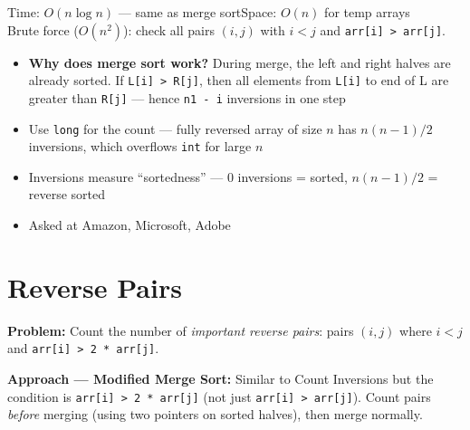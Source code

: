 \documentclass[12pt,a4paper,oneside]{book}
\begin{document}
\begin{complexity}
Time: $O(n \log n)$ --- same as merge sort\quad Space: $O(n)$ for temp arrays\\[4pt]
Brute force ($O(n^2)$): check all pairs $(i,j)$ with $i < j$ and \texttt{arr[i] > arr[j]}.
\end{complexity}

\begin{interviewcorner}
\begin{itemize}
  \item \textbf{Why does merge sort work?} During merge, the left and right halves are already sorted. If \texttt{L[i] > R[j]}, then all elements from \texttt{L[i]} to end of L are greater than \texttt{R[j]} --- hence \texttt{n1 - i} inversions in one step
  \item Use \texttt{long} for the count --- fully reversed array of size $n$ has $n(n-1)/2$ inversions, which overflows \texttt{int} for large $n$
  \item Inversions measure ``sortedness'' --- 0 inversions = sorted, $n(n-1)/2$ = reverse sorted
  \item Asked at Amazon, Microsoft, Adobe
\end{itemize}
\end{interviewcorner}

\section{Reverse Pairs}

\textbf{Problem:} Count the number of \textit{important reverse pairs}: pairs $(i,j)$ where $i < j$ and \texttt{arr[i] > 2 * arr[j]}.

\textbf{Approach --- Modified Merge Sort:} Similar to Count Inversions but the condition is \texttt{arr[i] > 2 * arr[j]} (not just \texttt{arr[i] > arr[j]}). Count pairs \textit{before} merging (using two pointers on sorted halves), then merge normally.
\end{document}

